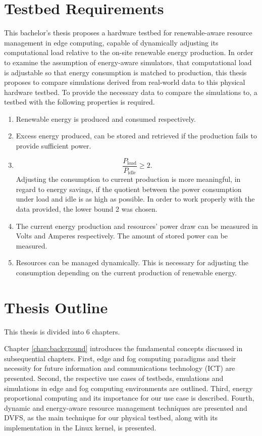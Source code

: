 \section{Testbed Requirements}
\label{sec:testbed_requirements}

This bachelor's thesis proposes a hardware testbed for renewable-aware resource
management in edge computing, capable of dynamically adjusting its computational
load relative to the on-site renewable energy production. In order to examine
the assumption of energy-aware simulators, that computational load is adjustable
so that energy consumption is matched to production, this thesis proposes to
compare simulations derived from real-world data to this physical hardware
testbed. To provide the necessary data to compare the simulations to, a testbed
with the following properties is required.

\begin{enumerate}
    \item Renewable energy is produced and consumed respectively.
    \item Excess energy produced, can be stored and retrieved if the production
        fails to provide sufficient power.
    \item \[ \frac{P_{\text{load}}}{P_{\text{idle}}} \geq 2 .\]
        Adjusting the consumption to current production is more meaningful, in
        regard to energy savings, if the quotient between the power consumption
        under load and idle is as high as possible. In order to work properly
        with the data provided, the lower bound 2 was chosen.
    \item The current energy production and resources' power draw can be
        measured in Volts and Amperes respectively. The amount of stored power
        can be measured.
    \item Resources can be managed dynamically. This is necessary for adjusting
        the consumption depending on the current production of renewable energy.
\end{enumerate}

\section{Thesis Outline}

This thesis is divided into 6 chapters.

Chapter \ref{chap:background} introduces the fundamental concepts discussed in
subsequential chapters. First, edge and fog computing paradigms and their
necessity for future information and communications technology (ICT) are
presented. Second, the respective use cases of testbeds, emulations and
simulations in edge and fog computing environments are outlined. Third, energy
proportional computing and its importance for our use case is described. Fourth,
dynamic and energy-aware resource management techniques are presented and DVFS,
as the main technique for our physical testbed, along with its implementation in
the Linux kernel, is presented.

